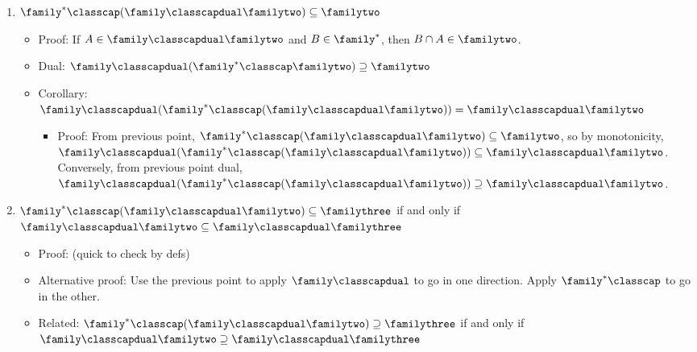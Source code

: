 \begin{enumerate}
\begin{itemize}
        \item Equality does not hold in general: set $\family = \syndetic$, $\familytwo = \thick$, and $\familythree = \syndetic$.

        \item Dual: (write it)
    \end{itemize}

    \item $\family^* \classcap (\family \classcapdual \familytwo) \subseteq \familytwo$
    \begin{itemize}
        \item Proof: If $A \in \family \classcapdual \familytwo$ and $B \in \family^*$, then $B \cap A \in \familytwo$.

        \item Dual: $\family \classcapdual (\family^* \classcap \familytwo) \supseteq \familytwo$

        \item Corollary: $\family \classcapdual (\family^* \classcap (\family \classcapdual \familytwo)) = \family \classcapdual \familytwo$
        \begin{itemize}
            \item Proof: From previous point, $\family^* \classcap (\family \classcapdual \familytwo) \subseteq \familytwo$, so by monotonicity, $\family \classcapdual (\family^* \classcap (\family \classcapdual \familytwo)) \subseteq \family \classcapdual \familytwo$.  Conversely, from previous point dual,  $\family \classcapdual (\family^* \classcap (\family \classcapdual \familytwo)) \supseteq \family \classcapdual \familytwo$.  
        \end{itemize}

    \end{itemize}
    
    \item $\family^* \classcap (\family \classcapdual \familytwo) \subseteq \familythree$ if and only if $\family \classcapdual \familytwo \subseteq \family \classcapdual \familythree$
    \begin{itemize}
        \item Proof: (quick to check by defs)

        \item Alternative proof: Use the previous point to apply $\family \classcapdual$ to go in one direction.  Apply $\family^* \classcap$ to go in the other.

        \item Related: $\family^* \classcap (\family \classcapdual \familytwo) \supseteq \familythree$ if and only if $\family \classcapdual \familytwo \supseteq \family \classcapdual \familythree$


\end{itemize}
\end{enumerate}
